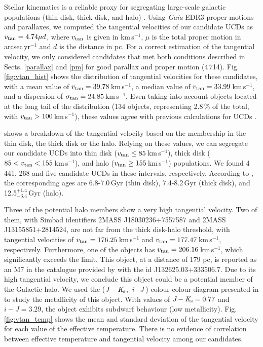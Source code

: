 Stellar kinematics is a reliable proxy for segregating large-scale galactic populations (thin disk, thick disk, and halo) \citep{Burgasser2015}. Using \textit{Gaia} EDR3 proper motions and parallaxes, we computed the tangential velocities of our candidate UCDs as $v_{\rm tan}=4.74 \mu d$, where $v_{\rm tan}$ is given in km\,s$^{-1}$, $\mu$ is the total proper motion in arcsec\,yr$^{-1}$ and $d$ is the distance in pc. For a correct estimation of the tangential velocity, we only considered candidates that met both conditions described in Sects. \ref{parallax} and \ref{pm} for good parallax and proper motion (4\,714). Fig. \ref{fig:vtan_hist} shows the distribution of tangential velocities for these candidates, with  a mean value of $v_{\rm tan}=39.78$\,km\,s$^{-1}$, a median value of $v_{\rm tan}=33.99$\,km\,s$^{-1}$, and a dispersion of $\sigma_{\rm tan}=24.85$\,km\,s$^{-1}$. Even taking into account objects located at the long tail of the distribution (134 objects, representing 2.8\,\% of the total, with $v_{\rm tan}>100$\,km\,s$^{-1}$), these values agree with previous calculations for UCDs \citep{faherty2009}.

\citet[][Fig. 10]{Torres2019} shows a breakdown of the tangential velocity based on the membership in the thin disk, the thick disk or the halo. Relying on these values, we can segregate our candidate UCDs into thin disk ($v_{\rm tan}\leq 85$\,km\,s$^{-1}$), thick disk ($85< v_{\rm tan}< 155$\,km\,s$^{-1}$), and halo ($v_{\rm tan}\geq 155$\,km\,s$^{-1}$) populations. We found 4\,441, 268 and five candidate UCDs in these intervals, respectively. According to \citet{Kilic2017}, the corresponding ages are 6.8-7.0\,Gyr (thin disk), 7.4-8.2\,Gyr (thick disk), and 12.5$^{+1.4}_{-3.4}$\,Gyr (halo).


Three of the potential halo members show a very high tangential velocity. Two of them, with Simbad identifiers 2MASS J18030236+7557587 and 2MASS J13155851+2814524, are not far from the thick disk-halo threshold, with tangential velocities of $v_{\rm tan}=176.25$\,km\,s$^{-1}$ and $v_{\rm tan}=177.47$\,km\,s$^{-1}$, respectively. Furthermore, one of the objects has $v_{\rm tan}=206.16$\,km\,s$^{-1}$, which significantly exceeds the limit. This object, at a distance of 179 pc, is reported as an M7 in the catalogue provided by \citet{ahmed2019} with the id J132625.03+333506.7. Due to its high tangential velocity, we conclude this object could be a potential member of the Galactic halo. We used the ($\textit{J}-\textit{K}_{\rm s}$, $\textit{i}-\textit{J}$) colour-colour diagram presented in \citet{lodieu2017} to study the metallicity of this object. With values of $\textit{J}-\textit{K}_{\rm s}=0.77$ and $\textit{i}-\textit{J}=3.29$, the object exhibits subdwarf behaviour (low metallicity). Fig. \ref{fig:vtan_temp} shows the mean and standard deviation of the tangential velocity for each value of the effective temperature. There is no evidence of correlation between effective temperature and tangential velocity among our candidates.

